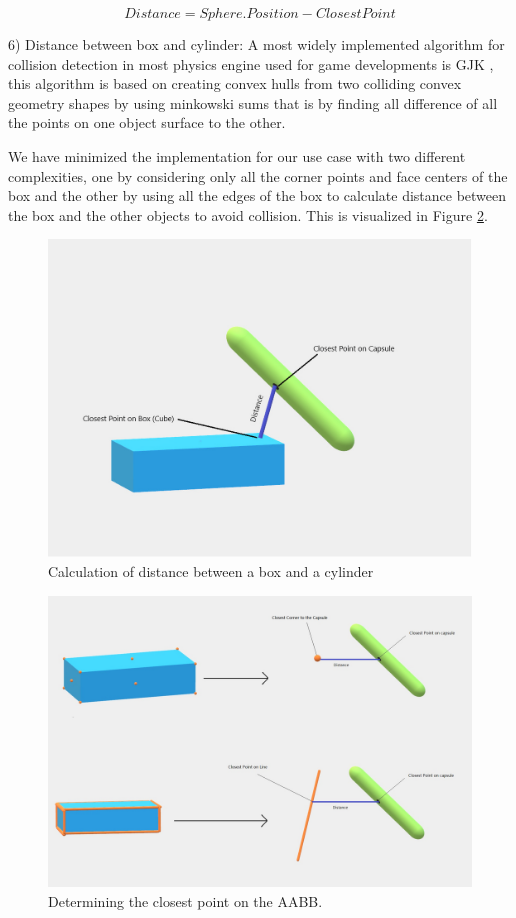 \documentclass[a4paper, 11.5pt, conference]{ieeeconf}      %
\begin{document}
\begin{equation}
	Distance = Sphere.Position - ClosestPoint
	\label{eq:boxsp}
\end{equation}

6) Distance between box and cylinder:
A most widely implemented algorithm for collision detection in most physics engine used for game developments is GJK \cite{GJK}, this algorithm is based on creating convex hulls from two colliding convex geometry shapes by using minkowski sums \cite{min} that is by finding all difference of all the points on one object surface to the other.

We have minimized the implementation for our use case with two different complexities, one by considering only all the corner points and face centers of the box and the other by using all the edges of the box to calculate distance between the box and the other objects to avoid collision. This is visualized in Figure \ref{fig:bc2}.

\begin{figure}[H]
    \centering
    \includegraphics[width=0.7\linewidth, height=0.4\linewidth]{images/box_capsule.jpeg}
    \caption{Calculation of distance between a box and a cylinder}
    \label{fig:bc1}
\end{figure}

\begin{figure}[H]
    \centering
    \includegraphics[width=0.7\linewidth, height=0.4\linewidth]{images/box_capsule1.jpeg}
    \caption{Determining the closest point on the AABB.}
    \label{fig:bc2}
\end{figure}
\end{document}
